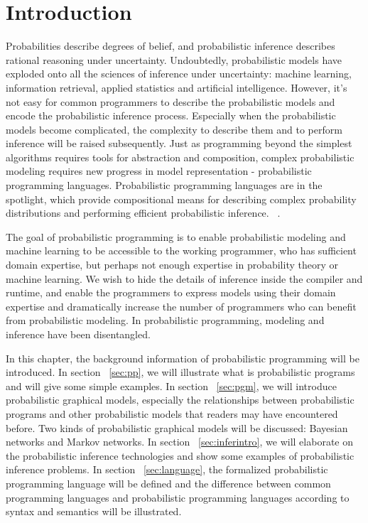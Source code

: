 \chapter{Introduction}
\label{chap:intro}
Probabilities describe degrees of belief, and probabilistic inference describes rational reasoning under uncertainty. Undoubtedly, probabilistic models have exploded onto all the sciences of inference under uncertainty: machine learning, information retrieval, applied statistics and artificial intelligence. However, it's not easy for common programmers to describe the probabilistic models and encode the probabilistic inference process. Especially when the probabilistic models become complicated, the complexity to describe them and to perform inference will be raised subsequently. Just as programming beyond the simplest algorithms requires tools for abstraction and composition, complex probabilistic modeling requires new progress in model representation - probabilistic programming languages. Probabilistic programming languages are in the spotlight, which provide compositional means for describing complex probability distributions and performing efficient probabilistic inference. ~\cite{goodman}.

The goal of probabilistic programming is to enable probabilistic modeling and machine learning to be accessible to the working programmer, who has sufficient domain expertise, but perhaps not enough expertise in probability theory or machine learning. We wish to hide the details of inference inside the compiler and runtime, and enable the programmers to express models using their domain expertise and dramatically increase the number of programmers who can benefit from probabilistic modeling. In probabilistic programming, modeling and inference have been disentangled.

In this chapter, the background information of probabilistic programming will be introduced. In section ~\ref{sec:pp}, we will illustrate what is probabilistic programs and will give some simple examples. In section ~\ref{sec:pgm}, we will introduce probabilistic graphical models, especially the relationships between probabilistic programs and other probabilistic models that readers may have encountered before. Two kinds of probabilistic graphical models will be discussed: Bayesian networks and Markov networks. In section ~\ref{sec:inferintro}, we will elaborate on the probabilistic inference technologies and show some examples of probabilistic inference problems. In section ~\ref{sec:language}, the formalized probabilistic programming language will be defined and the difference between common programming languages and probabilistic programming languages according to syntax and semantics will be illustrated. 

